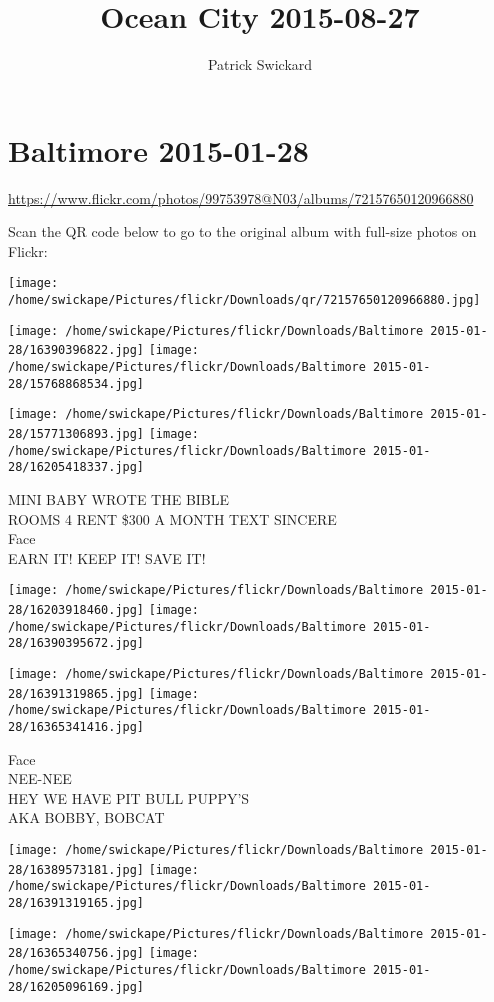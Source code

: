 \documentclass[10pt,letterpaper]{article}
\title{Ocean City 2015-08-27}
\author{Patrick Swickard}
\date{}
\begin{document}
\section*{Baltimore 2015-01-28}

\url{https://www.flickr.com/photos/99753978@N03/albums/72157650120966880}

Scan the QR code below to go to the original album with full-size photos on Flickr:

\texttt{[image: /home/swickape/Pictures/flickr/Downloads/qr/72157650120966880.jpg]}
\pagebreak

\texttt{[image: /home/swickape/Pictures/flickr/Downloads/Baltimore 2015-01-28/16390396822.jpg]}
\texttt{[image: /home/swickape/Pictures/flickr/Downloads/Baltimore 2015-01-28/15768868534.jpg]}

\texttt{[image: /home/swickape/Pictures/flickr/Downloads/Baltimore 2015-01-28/15771306893.jpg]}
\texttt{[image: /home/swickape/Pictures/flickr/Downloads/Baltimore 2015-01-28/16205418337.jpg]}

MINI BABY WROTE THE BIBLE\\
ROOMS 4 RENT \$300 A MONTH TEXT SINCERE\\
Face\\
EARN IT!  KEEP IT!  SAVE IT!
\pagebreak

\texttt{[image: /home/swickape/Pictures/flickr/Downloads/Baltimore 2015-01-28/16203918460.jpg]}
\texttt{[image: /home/swickape/Pictures/flickr/Downloads/Baltimore 2015-01-28/16390395672.jpg]}

\texttt{[image: /home/swickape/Pictures/flickr/Downloads/Baltimore 2015-01-28/16391319865.jpg]}
\texttt{[image: /home/swickape/Pictures/flickr/Downloads/Baltimore 2015-01-28/16365341416.jpg]}

Face\\
NEE{-}NEE\\
HEY WE HAVE PIT BULL PUPPY'S\\
AKA BOBBY, BOBCAT
\pagebreak

\texttt{[image: /home/swickape/Pictures/flickr/Downloads/Baltimore 2015-01-28/16389573181.jpg]}
\texttt{[image: /home/swickape/Pictures/flickr/Downloads/Baltimore 2015-01-28/16391319165.jpg]}

\texttt{[image: /home/swickape/Pictures/flickr/Downloads/Baltimore 2015-01-28/16365340756.jpg]}
\texttt{[image: /home/swickape/Pictures/flickr/Downloads/Baltimore 2015-01-28/16205096169.jpg]}
\end{document}
